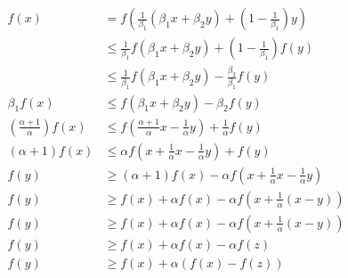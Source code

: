 \begin{align*}
    f(x)                                        & = f\left (\frac{1}{\beta_1} (\beta_1 x+\beta_2 y) + \left (1-\frac{1}{\beta_1}\right ) y\right ) \\[0.25cm]
                                                & \leq \frac{1}{\beta_1} f(\beta_1 x+ \beta_2 y) + \left (1-\frac{1}{\beta_1}\right ) f(y)         \\[0.25cm]
                                                & \leq \frac{1}{\beta_1} f(\beta_1 x+ \beta_2 y) - \frac{\beta_2}{\beta_1}  f(y)                   \\[0.25cm]
    \beta_1 f(x)                                & \leq f(\beta_1 x+\beta_2 y) - \beta_2 f(y)                                                       \\[0.25cm]
    \left (\frac{\alpha+1}{\alpha} \right )f(x) & \leq f\left (\frac{\alpha+1}{\alpha} x -\frac{1}{\alpha}  y\right ) + \frac{1}{\alpha} f(y)      \\[0.25cm]
    (\alpha+1) f(x)                             & \leq \alpha f\left (x+\frac{1}{\alpha}x-\frac{1}{\alpha}y\right ) + f(y)                         \\[0.25cm]
    f(y)                                        & \geq (\alpha+1) f(x) - \alpha f\left (x+\frac{1}{\alpha}x-\frac{1}{\alpha}y\right )              \\[0.25cm]
    f(y)                                        & \geq f(x) + \alpha f(x) -\alpha f\left (x+\frac{1}{\alpha}(x-y)\right )                          \\[0.25cm]
    f(y)                                        & \geq f(x) + \alpha f(x) -\alpha f\left (x+\frac{1}{\alpha}(x-y)\right )                          \\[0.25cm]
    f(y)                                        & \geq f(x) + \alpha f(x)-\alpha f(z)                                                              \\[0.25cm]
    f(y)                                        & \geq f(x) + \alpha \left (f(x)-f(z)\right)
\end{align*}